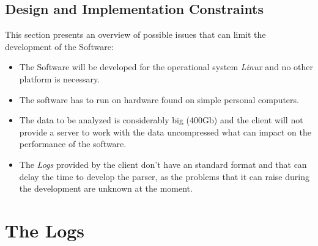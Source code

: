 \documentclass{scrreprt}
\begin{document}
\section{Design and Implementation Constraints}
This section presents an overview of possible issues that can limit the
development of the Software:
\begin{itemize}
\item The Software will be developed for the operational system \textit{Linux} and no
other platform is necessary.
\item The software has to run on hardware found on simple personal computers.
\item The data to be analyzed is considerably big (400Gb) and the client will not provide a
server to work with the data uncompressed what can impact on the performance of
the software.
\item The \textit{Logs} provided by the client don't have an standard format and that
can delay the time to develop the parser, as the problems that it can raise
during the development are unknown at the moment.
\end{itemize}







\chapter{The Logs}
\end{document}
